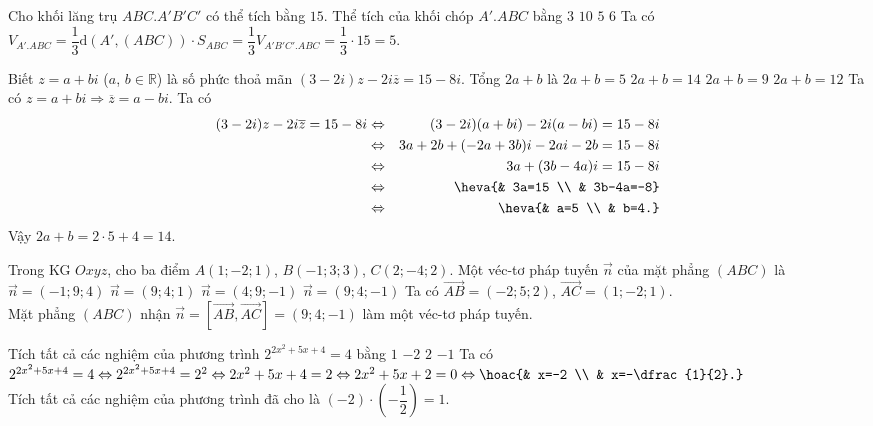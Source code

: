 \begin{ex}%
	Cho khối lăng trụ $ABC.A'B'C'$ có thể tích bằng $15$. Thể tích của khối chóp $A'.ABC$ bằng
	\choice
	{$3$}
	{$10$}
	{\True $5$}
	{$6$}
	\loigiai
	{
		Ta có $V_{A'.ABC}=\dfrac{1}{3}\mathrm{d}(A',(ABC))\cdot S_{ABC}=\dfrac{1}{3}V_{A'B'C'.ABC}=\dfrac{1}{3}\cdot 15=5$.	
	}
\end{ex}

\begin{ex}%
	Biết $z=a+bi$ ($a$, $b\in \mathbb{R}$) là số phức thoả mãn $(3-2i)z-2i\overline{z}=15-8i$. Tổng $2a+b$ là
	\choice
	{$2a+b=5$}
	{\True $2a+b=14$}
	{$2a+b=9$}
	{$2a+b=12$}
	\loigiai
	{
		Ta có $z=a+bi\Rightarrow \overline{z}=a-bi$. Ta có
		\begin{eqnarray*}
			(3-2i)z-2i\overline{z}=15-8i&\Leftrightarrow & (3-2i)(a+bi)-2i(a-bi)=15-8i\\
			&\Leftrightarrow & 3a+2b+(-2a+3b)i-2ai-2b=15-8i\\
			&\Leftrightarrow & 3a+(3b-4a)i=15-8i\\
			&\Leftrightarrow & \heva{& 3a=15 \\ & 3b-4a=-8}\\
			&\Leftrightarrow &\heva{& a=5 \\ & b=4.}
		\end{eqnarray*}
		Vậy $2a+b=2\cdot 5+4=14$.
	}
\end{ex}

\begin{ex}%
	Trong KG $Oxyz$, cho ba điểm $A(1;-2;1)$, $B(-1;3;3)$, $C(2;-4;2)$. Một véc-tơ pháp tuyến $\overrightarrow{n}$ của mặt phẳng $(ABC)$ là
	\choice
	{$\overrightarrow{n}=(-1;9;4)$}
	{$\overrightarrow{n}=(9;4;1)$}
	{$\overrightarrow{n}=(4;9;-1)$}
	{\True $\overrightarrow{n}=(9;4;-1)$}
	\loigiai
	{
		Ta có $\overrightarrow{AB}=(-2;5;2)$, $\overrightarrow{AC}=(1;-2;1)$.\\
		Mặt phẳng $(ABC)$ nhận $\overrightarrow{n}=\left[\overrightarrow{AB},\overrightarrow{AC}\right]=(9;4;-1)$ làm một véc-tơ pháp tuyến.
	}
\end{ex}

\begin{ex}%
	Tích tất cả các nghiệm của phương trình $2^{2x^2+5x+4}=4$ bằng
	\choice
	{\True $1$}
	{$-2$}
	{$2$}
	{$-1$}
	\loigiai
	{
		Ta có $2^{2x^2+5x+4}=4\Leftrightarrow 2^{2x^2+5x+4}=2^2\Leftrightarrow 2x^2+5x+4=2\Leftrightarrow 2x^2+5x+2=0\Leftrightarrow \hoac{& x=-2 \\ & x=-\dfrac{1}{2}.}$\\
		Tích tất cả các nghiệm của phương trình đã cho là $\left(-2\right)\cdot \left(-\dfrac{1}{2}\right)=1$.
	}
\end{ex}

